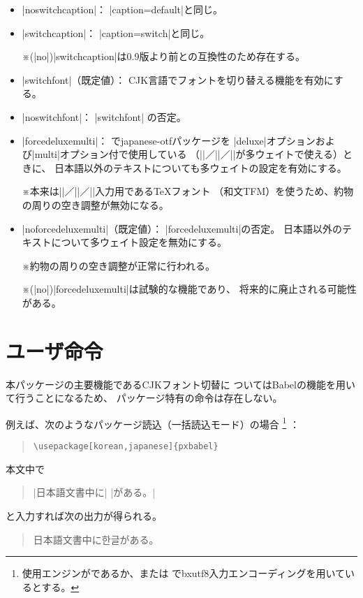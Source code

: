 \documentclass[uplatex,dvipdfmx,a4paper]{jsarticle}
\newcommand{\Pkg}[1]{\textsf{#1}}
\newcommand{\Note}{\par\noindent ※}
\newcommand{\Means}{：\quad\inhibitglue}
\newcommand{\XS}{\hspace{\xkanjiskip}}
\newcommand{\Kor}[1]{{\kanjishape{ko}\selectfont #1}}
\begin{document}
\begin{itemize}
\item |noswitchcaption|\Means
|caption=default|と同じ。

\item |switchcaption|\Means
|caption=switch|と同じ。
\Note (|no|)|switchcaption|は0.9版より前との互換性のため存在する。

\item |switchfont|（既定値）\Means
CJK言語でフォントを切り替える機能を有効にする。

\item |noswitchfont|\Means
|switchfont| の否定。

\item |forcedeluxemulti|\Means
{\upLaTeX}で\Pkg{japanese-otf}パッケージを
|deluxe|オプションおよび|multi|オプション付で使用している
（|\UTFK|／|\UTFC|／|\UTFT|が多ウェイトで使える）ときに、
日本語以外のテキストについても多ウェイトの設定を有効にする。
\Note 本来は\XS|\UTFK|／|\UTFC|／|\UTFT|入力用である{\TeX}フォント
（和文TFM）を使うため、約物の周りの空き調整が無効になる。

\item |noforcedeluxemulti|（既定値）\Means
|forcedeluxemulti|の否定。
日本語以外のテキストについて多ウェイト設定を無効にする。
\Note 約物の周りの空き調整が正常に行われる。
\Note (|no|)|forcedeluxemulti|は試験的な機能であり、
将来的に廃止される可能性がある。
\end{itemize}

\section{ユーザ命令}
\label{sec:Commands}

本パッケージの主要機能であるCJKフォント切替に
ついてはBabelの機能を用いて行うことになるため、
パッケージ特有の命令は存在しない。

例えば、次のようなパッケージ読込（一括読込モード）の場合
\footnote{使用エンジンが{\upLaTeX}であるか、または
  {\pLaTeX}で\Pkg{bxutf8}入力エンコーディングを用いているとする。}%
：
\begin{quote}\begin{verbatim}
\usepackage[korean,japanese]{pxbabel}
\end{verbatim}\end{quote}
本文中で
\begin{quote}
|日本語文書中に\foreignlanguage{korean}{|%
\textgt{\Kor{한글}}|}がある。|
\end{quote} 
と入力すれば次の出力が得られる。
\begin{quote}
日本語文書中に\Kor{한글}がある。
\end{quote} 
\end{document}
